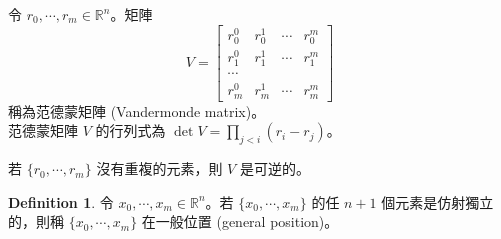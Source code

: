 \documentclass[12pt]{article}
\theoremstyle{definition}
\newtheorem{definition}{Definition}[section]
\newcommand\<{\langle}
\renewcommand\>{\rangle}
\begin{document}
\begin{CJK}{UTF8}{bsmi}
令 $r_0, \cdots, r_m\in\mathbb{R}^n$。矩陣
\[
    V =
    \begin{bmatrix}
        r_0^0 & r_0^1 & \cdots & r_0^m \\
        r_1^0 & r_1^1 & \cdots & r_1^m \\
        \cdots \\
        r_m^0 & r_m^1 & \cdots & r_m^m 
    \end{bmatrix}
\]
稱為范德蒙矩陣 (Vandermonde matrix)。 \\

范德蒙矩陣 $V$ 的行列式為 $\det V=\prod_{j<i}(r_i-r_j)$。

若 $\{r_0, \cdots, r_m\}$ 沒有重複的元素，則 $V$ 是可逆的。

\begin{definition}
    令 $x_0, \cdots, x_m\in\mathbb{R}^n$。若 $\{x_0, \cdots, x_m\}$ 的任 $n+1$ 個元素是仿射獨立的，則稱 $\{x_0, \cdots, x_m\}$ 在一般位置 (general position)。
\end{definition}


\end{CJK}
\end{document}
